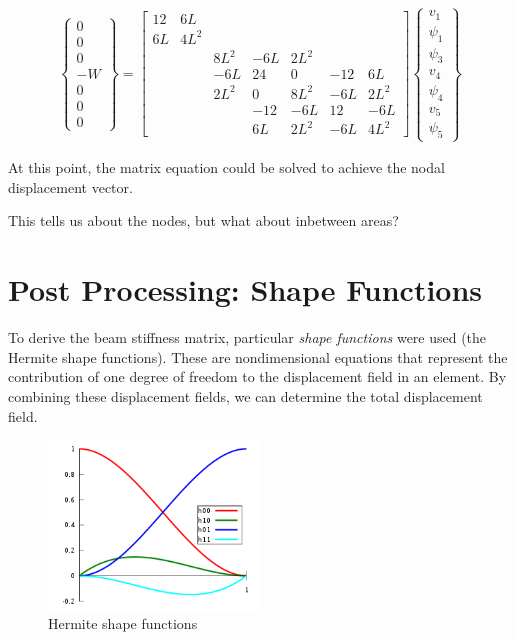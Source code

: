 \documentclass[10pt,letterpaper]{article}
\begin{document}
	\begin{align}
		\begin{Bmatrix}
			0 \\
			0 \\
			0 \\
			-W \\
			0 \\
			0 \\
			0
		\end{Bmatrix} = \begin{bmatrix}
12 & 6L & & & & & \\
6L & 4L^2 & & & & & \\
 & & 8L^2 & -6L & 2L^2 & & \\
 & & -6L & 24 & 0 & -12 & 6L \\
 & & 2L^2 & 0 & 8L^2 & -6L & 2L^2 \\
 & & & -12 & -6L & 12 & -6L \\
 & & & 6L & 2L^2 & -6L & 4L^2 
 		\end{bmatrix} \begin{Bmatrix}
			v_1 \\
			\psi_1 \\
			\psi_3 \\
			v_4 \\
			\psi_4 \\
			v_5 \\
			\psi_5
		\end{Bmatrix}
	\end{align}

	At this point, the matrix equation could be solved to achieve the nodal displacement vector.

	This tells us about the nodes, but what about inbetween areas?

	\section{Post Processing: Shape Functions}

	To derive the beam stiffness matrix, particular \textit{shape functions} were used (the Hermite shape functions). These are nondimensional equations that represent the contribution of one degree of freedom to the displacement field in an element. By combining these displacement fields, we can determine the total displacement field.

	\begin{figure}[H]
		\includegraphics[width=0.5\textwidth]{hermite.png}
		\caption{Hermite shape functions}
	\end{figure}
\end{document}
